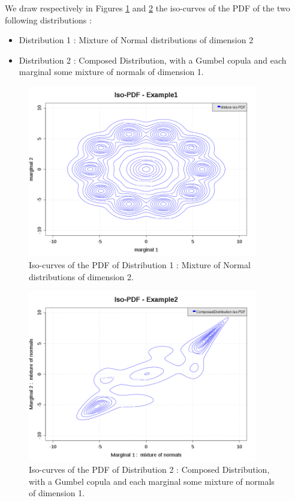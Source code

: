 We draw respectively  in Figures \ref{tulipe} and \ref{contour2D_example2} the iso-curves of the PDF of the two following  distributions :
\begin{itemize}
\item Distribution 1 : Mixture of Normal distributions of dimension 2
\item Distribution 2 : Composed Distribution, with a Gumbel copula and each marginal some mixture of normals of dimension 1.
\end{itemize}



\begin{figure}[H]
  \begin{center}
    \includegraphics[width=10cm]{contour2D_tulipe.png}
  \end{center}
  \caption{Iso-curves of the PDF of Distribution 1 : Mixture of Normal distributions of dimension 2.}
  \label{tulipe}
\end{figure}

\begin{figure}[H]
  \begin{center}
    \includegraphics[width=10cm]{contour2D_2.png}
  \end{center}
  \caption{Iso-curves of the PDF of Distribution 2 : Composed Distribution, with a Gumbel copula and each marginal some mixture of normals of dimension 1.}
  \label{contour2D_example2}
\end{figure}


